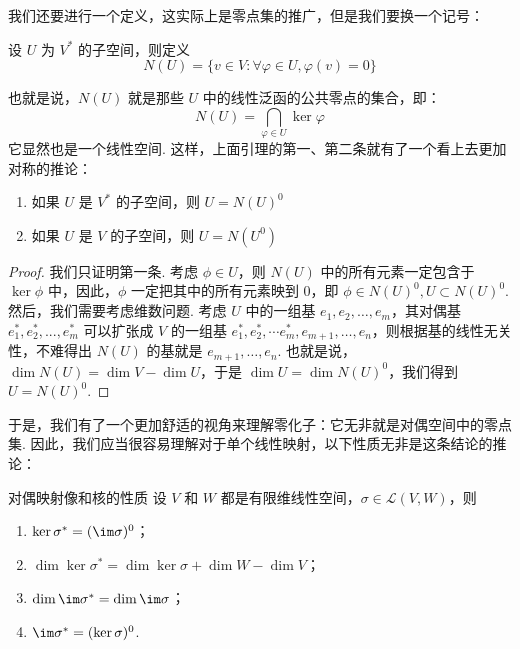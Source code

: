 我们还要进行一个定义，这实际上是零点集的推广，但是我们要换一个记号：

\begin{definition}{}{}
    设 $U$ 为 $V^*$ 的子空间，则定义
    \[
        N(U) = \{v \in V: \forall \varphi \in U, \varphi(v) = 0\}
    \]
\end{definition}

也就是说，$N(U)$ 就是那些 $U$ 中的线性泛函的公共零点的集合，即：
\[
    N(U) = \bigcap_{\varphi \in U} \ker \varphi
\]
它显然也是一个线性空间. 这样，上面引理的第一、第二条就有了一个看上去更加对称的推论：

\begin{lemma}{}{}
    \begin{enumerate}
        \item 如果 $U$ 是 $V^*$ 的子空间，则 $U = N(U)^0$
        \item 如果 $U$ 是 $V$ 的子空间，则 $U = N(U^0)$
    \end{enumerate}
\end{lemma}

\begin{proof}
    我们只证明第一条. 考虑 $\phi \in U$，则 $N(U)$ 中的所有元素一定包含于 $\ker \phi$ 中，因此，$\phi$ 一定把其中的所有元素映到 $0$，即 $\phi \in N(U)^0, U \subset N(U)^0$. 然后，我们需要考虑维数问题. 考虑 $U$ 中的一组基 $e_1, e_2,\ldots, e_m$，其对偶基 $e_1^*, e_2^*, ..., e_m^*$ 可以扩张成 $V$ 的一组基 $e_1^*, e_2^*, \cdots e_m^*, e_{m + 1},\ldots, e_n$，则根据基的线性无关性，不难得出 $N(U)$ 的基就是 $e_{m + 1},\ldots, e_n$. 也就是说，$\dim N(U) = \dim V - \dim U$，于是 $\dim U = \dim N(U)^0$，我们得到 $U = N(U)^0$.
\end{proof}

于是，我们有了一个更加舒适的视角来理解零化子：它无非就是对偶空间中的零点集. 因此，我们应当很容易理解对于单个线性映射，以下性质无非是这条结论的推论：

\begin{theorem}{}{对偶映射像和核的性质}
    设 $V$ 和 $W$ 都是有限维线性空间，$\sigma\in\mathcal{L}(V,W)$，则
    \begin{enumerate}
        \item $\ker\sigma^*=(\im\sigma)^0$；
        \item $\dim\ker\sigma^*=\dim\ker\sigma+\dim W-\dim V$；
        \item $\dim\im\sigma^*=\dim\im\sigma$；
        \item $\im\sigma^*=(\ker\sigma)^0$.
    \end{enumerate}
\end{theorem}

